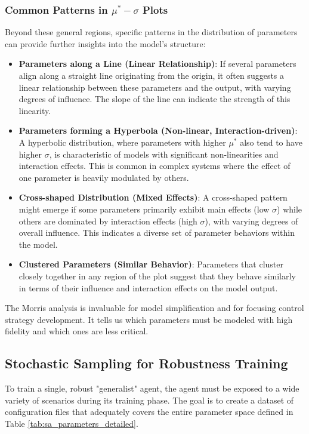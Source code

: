 \subsubsection{Common Patterns in $\mu^*-\sigma$ Plots}
Beyond these general regions, specific patterns in the distribution of parameters can provide further insights into the model's structure:
\begin{itemize}
    \item \textbf{Parameters along a Line (Linear Relationship)}: If several parameters align along a straight line originating from the origin, it often suggests a linear relationship between these parameters and the output, with varying degrees of influence. The slope of the line can indicate the strength of this linearity.
    \item \textbf{Parameters forming a Hyperbola (Non-linear, Interaction-driven)}: A hyperbolic distribution, where parameters with higher $\mu^*$ also tend to have higher $\sigma$, is characteristic of models with significant non-linearities and interaction effects. This is common in complex systems where the effect of one parameter is heavily modulated by others.
    \item \textbf{Cross-shaped Distribution (Mixed Effects)}: A cross-shaped pattern might emerge if some parameters primarily exhibit main effects (low $\sigma$) while others are dominated by interaction effects (high $\sigma$), with varying degrees of overall influence. This indicates a diverse set of parameter behaviors within the model.
    \item \textbf{Clustered Parameters (Similar Behavior)}: Parameters that cluster closely together in any region of the plot suggest that they behave similarly in terms of their influence and interaction effects on the model output.
\end{itemize}
The Morris analysis is invaluable for model simplification and for focusing control strategy development. It tells us which parameters must be modeled with high fidelity and which ones are less critical.

\subsection{Stochastic Sampling for Robustness Training}
\noindent
To train a single, robust "generalist" agent, the agent must be exposed to a wide variety of scenarios during its training phase. The goal is to create a dataset of configuration files that adequately covers the entire parameter space defined in Table \ref{tab:sa_parameters_detailed}.

